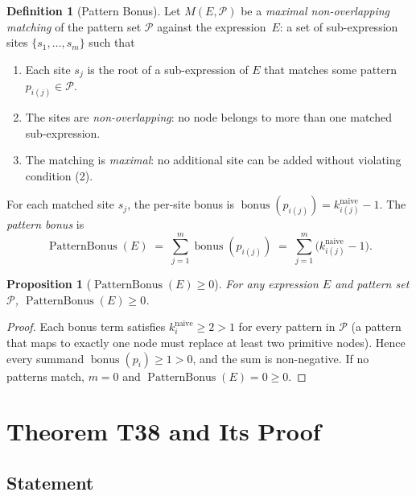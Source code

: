 \documentclass[12pt,a4paper]{article}
\newtheorem{proposition}[theorem]{Proposition}
\theoremstyle{definition}
\newtheorem{definition}[theorem]{Definition}
\newcommand{\PB}{\operatorname{PatternBonus}}
\newcommand{\bonus}{\operatorname{bonus}}
\begin{document}
\begin{definition}[Pattern Bonus]
\label{def:PB}
Let $M(E, \mathcal{P})$ be a \emph{maximal non-overlapping matching} of the
pattern set $\mathcal{P}$ against the expression~$E$: a set of sub-expression
sites $\{s_1, \ldots, s_m\}$ such that
\begin{enumerate}
  \item Each site $s_j$ is the root of a sub-expression of $E$ that matches
        some pattern $p_{i(j)} \in \mathcal{P}$.
  \item The sites are \emph{non-overlapping}: no node belongs to more than one
        matched sub-expression.
  \item The matching is \emph{maximal}: no additional site can be added without
        violating condition (2).
\end{enumerate}
For each matched site $s_j$, the per-site bonus is
$\bonus(p_{i(j)}) = k_{i(j)}^{\mathrm{naive}} - 1$.
The \emph{pattern bonus} is
\[
  \PB(E) \;=\; \sum_{j=1}^{m} \bonus(p_{i(j)})
         \;=\; \sum_{j=1}^{m} \bigl(k_{i(j)}^{\mathrm{naive}} - 1\bigr).
\]
\end{definition}

\begin{proposition}[$\PB(E) \geq 0$]
\label{prop:PB-nonneg}
For any expression $E$ and pattern set $\mathcal{P}$, $\PB(E) \geq 0$.
\end{proposition}

\begin{proof}
Each bonus term satisfies $k_i^{\mathrm{naive}} \geq 2 > 1$ for every pattern
in $\mathcal{P}$ (a pattern that maps to exactly one node must replace at least
two primitive nodes).  Hence every summand $\bonus(p_i) \geq 1 > 0$, and the
sum is non-negative.  If no patterns match, $m = 0$ and $\PB(E) = 0 \geq 0$.
\end{proof}

\section{Theorem T38 and Its Proof}
\label{sec:T38}

\subsection{Statement}
\end{document}
